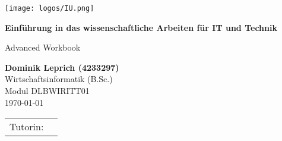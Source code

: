 \def\usesf{}
\let\usesf\sffamily %

\newsavebox{\Tutorin}


\setlength{\unitlength}{1pt}

\begin{titlepage}
\vspace{-39pt}\hspace*{300pt}\texttt{[image: logos/IU.png]}

\begin{center}
\hbox{}
\vfill
{\usesf}
{\huge\bfseries Einführung in das wissenschaftliche Arbeiten für IT und Technik\par}
\vskip 1.8cm
Advanced Workbook\\[2mm]
\vskip 1cm

{\large\bfseries Dominik Leprich (4233297)\\}
\vskip 1.2cm
Wirtschaftsinformatik (B.Sc.)\\
Modul DLBWIRITT01\\
\today %
\vskip 3cm
\begin{tabular}{p{3cm}l}
Tutorin: & \usebox{\Tutorin} \\
\end{tabular}
\vfill
\end{center}

\end{titlepage}


